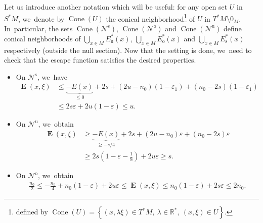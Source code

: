\documentclass[11pt]{article}
\newcommand{\ro}{\mathrm{o}}
\newcommand{\rs}{\mathrm{s}}
\newcommand{\ru}{\mathrm{u}}
\theoremstyle{definition}
\theoremstyle{plain}
\newcommand{\Ncal}{\mathcal{N}}
\newcommand{\R}{\mathbb{R}}
\DeclareMathOperator{\Cone}{Cone}
\DeclareMathOperator{\E}{\boldsymbol{E}}
\begin{document}
Let us introduce another notation which will be useful: for any open set $U$ in $S^*M$, we~denote by $\Cone(U)$ the conical neighborhood\footnote{defined by $\Cone(U) = \left\{ (x,\lambda \xi) \in T^* M, \: \lambda \in \R^*, \: (x,\xi) \in U \right\}$.} of $U$ in $T^*M \setminus 0_M$. In~particular, the sets $\Cone(\Ncal^\rs)$, $\Cone(\Ncal^\ro)$ and $\Cone(\Ncal^\ru)$ define conical neighborhoods of $\bigcup_{x \in M} E_\ru^* (x)$, $\bigcup_{x \in M} E_\ro^* (x)$ and $\bigcup_{x \in M} E_\rs^* (x)$ respectively (outside the null section). Now that the setting is done, we~need to check that the escape function satisfies the desired properties.
\begin{itemize}
\item On $\Ncal^\rs$, we~have
\begin{align*}
\E(x,\xi) &\leq \underbrace{-E (x)}_{\leq 0} + 2s + (2u - n_0) (1 - \varepsilon_1) + (n_0 - 2s) (1 - \varepsilon_1) \\
&\leq 2s \varepsilon + 2u (1 - \varepsilon) \leq u.
\end{align*}
\item On $\Ncal^\ru$, we~obtain
\begin{align*}
\E(x,\xi) &\geq \underbrace{-E (x)}_{\geq - s/4} + 2s + (2u - n_0) \varepsilon + (n_0 - 2s) \varepsilon \\
&\geq 2s (1 - \varepsilon - \frac{1}{8}) + 2u \varepsilon \geq s.
\end{align*}
\item On $\Ncal^\ro$, we~obtain
\begin{align*}
\frac{n_0}{2} \leq - \frac{n_0}{4} + n_0 (1 - \varepsilon) + 2u \varepsilon \leq \E(x,\xi) \leq n_0 (1 - \varepsilon) + 2s \varepsilon \leq 2n_0.
\end{align*}
\end{itemize}
\end{document}
